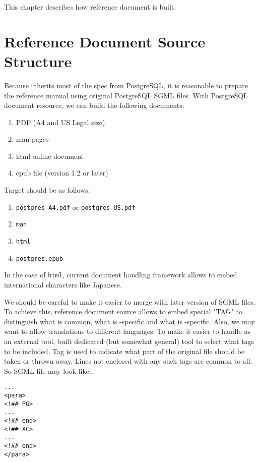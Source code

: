 %
%

	This chapter describes how \XC{} reference document is built.


\section{\XC{} Reference Document Source Structure}

	Because \XC{} inherits most of the spec from PostgreSQL, it is reasonable to prepare
	the reference manual using original PostgreSQL SGML files.
	With PostgreSQL document resource, we can build the following documents:

	\begin{enumerate}
		\item PDF (A4 and US Legal size)
		\item man pages
		\item html online document
		\item epub file (version 1.2 or later)
	\end{enumerate}

	Target should be as follows:

	\begin{enumerate}
		\item {\tt postgres-A4.pdf} or {\tt postgres-US.pdf}
		\item {\tt man}
		\item {\tt html}
		\item {\tt postgres.epub}
	\end{enumerate}

	In the case of {\tt html}, current \XC{} document handling framework allows
	to embed international characters like Japanese.

	We should be careful to make it easier to merge with later version of \PG{} SGML files.
	To achieve this, \XC{} reference document source allows to embed special "TAG" to distinguish
	what is common, what is \PG-specific and what is \XC-specific.
	Also, we may want to allow translations to different languages.
	To make it easier to handle as an external tool, \XC{} built dedicated (but somewhat general)
	tool to select what tags to be included.
	Tag is used to indicate what part of the original file should be taken or thrown away.
	Lines not enclosed with any such tags are common to all.
	So SGML file may look like...

	\begin{lstlisting}[frame=single]
...
<para>
<!## PG>
...
<!## end>
<!## XC>
...
<!## end>
</para>
	\end{lstlisting}

